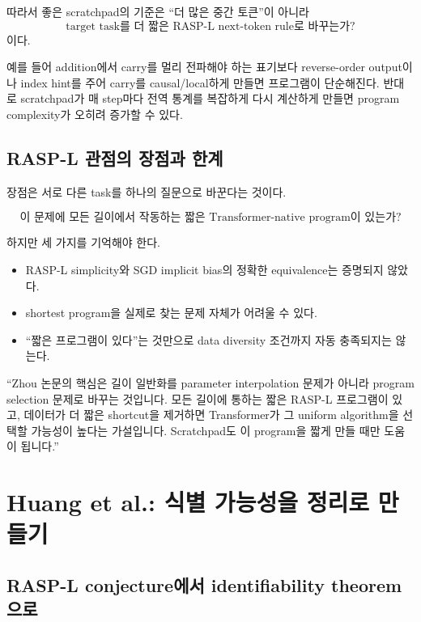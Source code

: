 \documentclass[11pt,a4paper,oneside,openany]{memoir}
\theoremstyle{definition}
\begin{document}
따라서 좋은 scratchpad의 기준은 ``더 많은 중간 토큰''이 아니라
\[
\text{target task를 더 짧은 RASP-L next-token rule로 바꾸는가?}
\]
이다.

예를 들어 addition에서 carry를 멀리 전파해야 하는 표기보다 reverse-order output이나 index hint를 주어 carry를 causal/local하게 만들면 프로그램이 단순해진다.
반대로 scratchpad가 매 step마다 전역 통계를 복잡하게 다시 계산하게 만들면 program complexity가 오히려 증가할 수 있다.

\section{RASP-L 관점의 장점과 한계}

장점은 서로 다른 task를 하나의 질문으로 바꾼다는 것이다.

\[
\boxed{\text{이 문제에 모든 길이에서 작동하는 짧은 Transformer-native program이 있는가?}}
\]

하지만 세 가지를 기억해야 한다.

\begin{itemize}
\item RASP-L simplicity와 SGD implicit bias의 정확한 equivalence는 증명되지 않았다.
\item shortest program을 실제로 찾는 문제 자체가 어려울 수 있다.
\item ``짧은 프로그램이 있다''는 것만으로 data diversity 조건까지 자동 충족되지는 않는다.
\end{itemize}

\begin{presentbox}
``Zhou 논문의 핵심은 길이 일반화를 parameter interpolation 문제가 아니라 program selection 문제로 바꾸는 것입니다. 모든 길이에 통하는 짧은 RASP-L 프로그램이 있고, 데이터가 더 짧은 shortcut을 제거하면 Transformer가 그 uniform algorithm을 선택할 가능성이 높다는 가설입니다. Scratchpad도 이 program을 짧게 만들 때만 도움이 됩니다.''
\end{presentbox}

\chapter{Huang et al.: 식별 가능성을 정리로 만들기}

\section{RASP-L conjecture에서 identifiability theorem으로}
\end{document}
